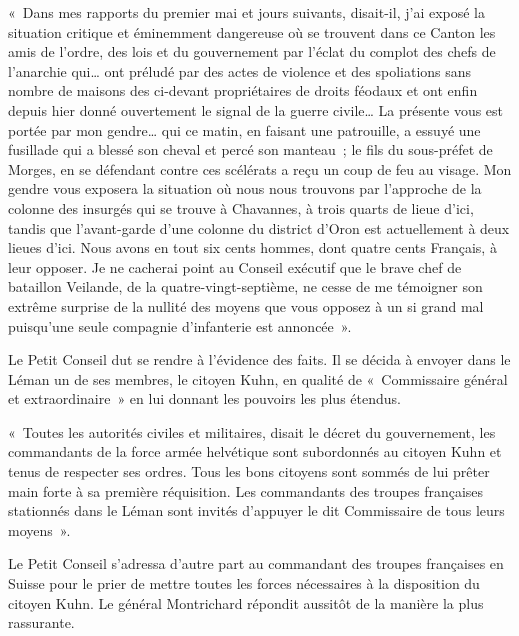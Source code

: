 \documentclass[french,twoside]{book} %
\newenvironment{quoteblock}%
  {\begin{quoting}}
  {\end{quoting}}
\newenvironment{quotebar}{%
    \def\FrameCommand{{\color{rubric!10!}\vrule width 0.5em} \hspace{0.9em}}%
    \def\OuterFrameSep{\itemsep} %
    \MakeFramed {\advance\hsize-\width \FrameRestore}
  }%
  {%
    \endMakeFramed
  }
\renewenvironment{quoteblock}%
  {%
    \savenotes
    \setstretch{0.9}
    \normalfont
    \begin{quotebar}
  }
  {%
    \end{quotebar}
    \spewnotes
  }
\begin{document}
\begin{quoteblock}
 \noindent « Dans mes rapports du premier mai et jours suivants, disait-il, j’ai exposé la situation critique et éminemment dangereuse où se trouvent dans ce Canton les amis de l’ordre, des lois et du gouvernement par l’éclat du complot des chefs de l’anarchie qui… ont préludé par des actes de violence et des spoliations sans nombre de maisons des ci-devant propriétaires de droits féodaux et ont enfin depuis hier donné ouvertement le signal de la guerre civile… La présente vous est portée par mon gendre… qui ce matin, en faisant une patrouille, a essuyé une fusillade qui a blessé son cheval et percé son manteau ; le fils du sous-préfet de Morges, en se défendant contre ces scélérats a reçu un coup de feu au visage. Mon gendre vous exposera la situation où nous nous trouvons par l’approche de la colonne des insurgés qui se trouve à Chavannes, à trois quarts de lieue d’ici, tandis que l’avant-garde d’une colonne du district d’Oron est actuellement à deux lieues d’ici. Nous avons en tout six cents hommes, dont quatre cents Français, à leur opposer. Je ne cacherai point au Conseil exécutif que le brave chef de bataillon Veilande, de la quatre-vingt-septième, ne cesse de me témoigner son extrême surprise de la nullité des moyens que vous opposez à un si grand mal puisqu’une seule compagnie d’infanterie est annoncée ».
 \end{quoteblock}

\noindent Le Petit Conseil dut se rendre à l’évidence des faits. Il se décida à envoyer dans le Léman un de ses membres, le citoyen Kuhn, en qualité de « Commissaire général et extraordinaire » en lui donnant les pouvoirs les plus étendus.\par

\begin{quoteblock}
 \noindent « Toutes les autorités civiles et militaires, disait le décret du gouvernement, les commandants de la force armée helvétique sont subordonnés au citoyen Kuhn et tenus de respecter ses ordres. Tous les bons citoyens sont sommés de lui prêter main forte à sa première réquisition. Les commandants des troupes françaises stationnés dans le Léman sont invités d’appuyer le dit Commissaire de tous leurs moyens ».
 \end{quoteblock}

\noindent Le Petit Conseil s’adressa d’autre part au commandant des troupes françaises en Suisse pour le prier de mettre toutes les forces nécessaires à la disposition du citoyen Kuhn. Le général Montrichard répondit aussitôt de la manière la plus rassurante. \par
\end{document}
